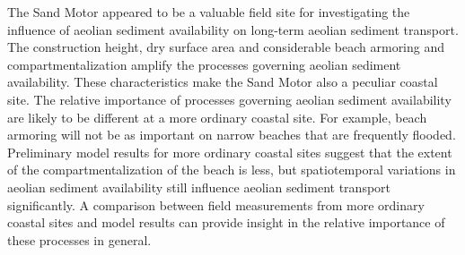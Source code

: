 The Sand Motor appeared to be a valuable field site for investigating
the influence of aeolian sediment availability on long-term aeolian
sediment transport. The construction height, dry surface area and
considerable beach armoring and compartmentalization amplify the
processes governing aeolian sediment availability. These
characteristics make the Sand Motor also a peculiar coastal site. The
relative importance of processes governing aeolian sediment
availability are likely to be different at a more ordinary coastal
site. For example, beach armoring will not be as important on narrow
beaches that are frequently flooded. Preliminary model results for
more ordinary coastal sites suggest that the extent of the
compartmentalization of the beach is less, but spatiotemporal
variations in aeolian sediment availability still influence aeolian
sediment transport significantly. A comparison between field
measurements from more ordinary coastal sites and model results can
provide insight in the relative importance of these processes in
general.

%
%
%





